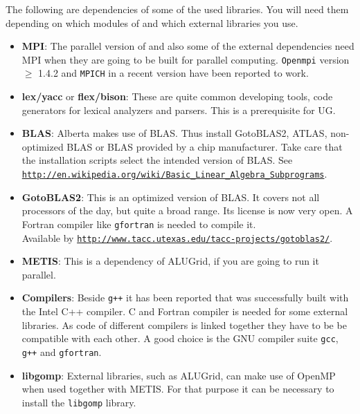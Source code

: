 The following are dependencies of some of the used libraries. You will need them depending on which modules of \Dune and which external libraries you use.

\begin{itemize}
\item \textbf{MPI}: The parallel version of \Dune and also some of the external dependencies need MPI when they are going to be built for parallel computing. \texttt{Openmpi} version $\geqslant$ 1.4.2 and \texttt{MPICH} in a recent version have been reported to work. 

\item \textbf{lex/yacc} or \textbf{flex/bison}: These are quite common developing tools, code generators for lexical analyzers and parsers. This is a prerequisite for UG.

\item \textbf{BLAS}: Alberta makes use of BLAS. Thus install GotoBLAS2, ATLAS, non-optimized BLAS or BLAS provided by a chip manufacturer. Take care that the installation scripts select the intended version of BLAS. See \texttt{\url{http://en.wikipedia.org/wiki/Basic_Linear_Algebra_Subprograms}}.

\item \textbf{GotoBLAS2}: This is an optimized version of BLAS. It covers not  all processors of the day, but quite a broad range. Its license is now very open.  A Fortran compiler like \texttt{gfortran} is needed to compile it.\\
Available by \texttt{\url{http://www.tacc.utexas.edu/tacc-projects/gotoblas2/}}.

\item \textbf{METIS}: This is a dependency of ALUGrid, if you are going to run it parallel.

\item \textbf{Compilers}: Beside \texttt{g++} it has been reported that \Dune was successfully built with the Intel C++ compiler. 
C and Fortran compiler is needed for some external libraries. As code of different compilers is linked together they have to be be compatible with each other. A good choice is the GNU compiler suite \texttt{gcc}, \texttt{g++} and \texttt{gfortran}.

\item \textbf{libgomp}: External libraries, such as ALUGrid, can make use of OpenMP when used together with METIS. For that purpose it can be necessary to install the \texttt{libgomp} library.

\end{itemize}

